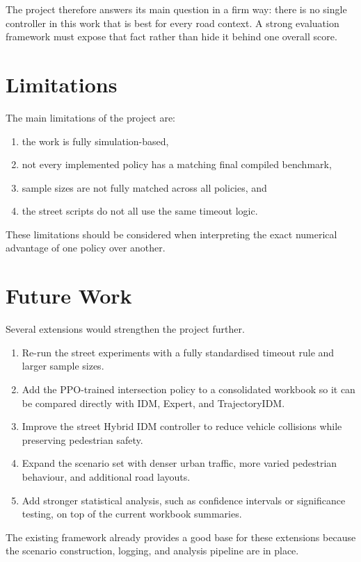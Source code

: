 \documentclass[12pt,a4paper]{report}
\begin{document}
The project therefore answers its main question in a firm way: there is no single controller in this work that is best for every road context. A strong evaluation framework must expose that fact rather than hide it behind one overall score.

\section{Limitations}
The main limitations of the project are:

\begin{enumerate}[label=\arabic*.]
    \item the work is fully simulation-based,
    \item not every implemented policy has a matching final compiled benchmark,
    \item sample sizes are not fully matched across all policies, and
    \item the street scripts do not all use the same timeout logic.
\end{enumerate}

These limitations should be considered when interpreting the exact numerical advantage of one policy over another.

\section{Future Work}
Several extensions would strengthen the project further.

\begin{enumerate}[label=\arabic*.]
    \item Re-run the street experiments with a fully standardised timeout rule and larger sample sizes.
    \item Add the PPO-trained intersection policy to a consolidated workbook so it can be compared directly with IDM, Expert, and TrajectoryIDM.
    \item Improve the street Hybrid IDM controller to reduce vehicle collisions while preserving pedestrian safety.
    \item Expand the scenario set with denser urban traffic, more varied pedestrian behaviour, and additional road layouts.
    \item Add stronger statistical analysis, such as confidence intervals or significance testing, on top of the current workbook summaries.
\end{enumerate}

The existing framework already provides a good base for these extensions because the scenario construction, logging, and analysis pipeline are in place.
\end{document}

